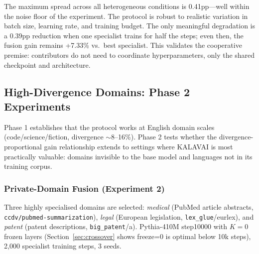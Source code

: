 \documentclass{article}
\begin{document}
The maximum spread across all heterogeneous conditions is 0.41pp---well within the noise floor of the experiment. The protocol is robust to realistic variation in batch size, learning rate, and training budget. The only meaningful degradation is a 0.39pp reduction when one specialist trains for half the steps; even then, the fusion gain remains +7.33\% vs.\ best specialist. This validates the cooperative premise: contributors do not need to coordinate hyperparameters, only the shared checkpoint and architecture.

\subsection{High-Divergence Domains: Phase 2 Experiments}
\label{sec:phase2}

Phase 1 establishes that the protocol works at English domain scales (code/science/fiction, divergence $\sim$8--16\%). Phase 2 tests whether the divergence-proportional gain relationship extends to settings where KALAVAI is most practically valuable: domains invisible to the base model and languages not in its training corpus.

\subsubsection{Private-Domain Fusion (Experiment 2)}
\label{sec:phase2_private}

Three highly specialised domains are selected: \emph{medical} (PubMed article abstracts, \texttt{ccdv/pubmed-summarization}), \emph{legal} (European legislation, \texttt{lex\_glue}/eurlex), and \emph{patent} (patent descriptions, \texttt{big\_patent}/a). Pythia-410M step10000 with $K=0$ frozen layers (Section~\ref{sec:crossover} shows freeze=0 is optimal below 10k steps), 2,000 specialist training steps, 3 seeds.
\end{document}
